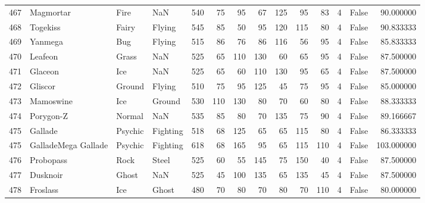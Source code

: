 \begin{tabular}{rlllrrrrrrrrlr}
 467 &                  Magmortar &      Fire &       NaN &    540 &   75 &      95 &       67 &      125 &       95 &     83 &           4 &      False &   90.000000 \\
 468 &                   Togekiss &     Fairy &    Flying &    545 &   85 &      50 &       95 &      120 &      115 &     80 &           4 &      False &   90.833333 \\
 469 &                    Yanmega &       Bug &    Flying &    515 &   86 &      76 &       86 &      116 &       56 &     95 &           4 &      False &   85.833333 \\
 470 &                    Leafeon &     Grass &       NaN &    525 &   65 &     110 &      130 &       60 &       65 &     95 &           4 &      False &   87.500000 \\
 471 &                    Glaceon &       Ice &       NaN &    525 &   65 &      60 &      110 &      130 &       95 &     65 &           4 &      False &   87.500000 \\
 472 &                    Gliscor &    Ground &    Flying &    510 &   75 &      95 &      125 &       45 &       75 &     95 &           4 &      False &   85.000000 \\
 473 &                  Mamoswine &       Ice &    Ground &    530 &  110 &     130 &       80 &       70 &       60 &     80 &           4 &      False &   88.333333 \\
 474 &                  Porygon-Z &    Normal &       NaN &    535 &   85 &      80 &       70 &      135 &       75 &     90 &           4 &      False &   89.166667 \\
 475 &                    Gallade &   Psychic &  Fighting &    518 &   68 &     125 &       65 &       65 &      115 &     80 &           4 &      False &   86.333333 \\
 475 &        GalladeMega Gallade &   Psychic &  Fighting &    618 &   68 &     165 &       95 &       65 &      115 &    110 &           4 &      False &  103.000000 \\
 476 &                  Probopass &      Rock &     Steel &    525 &   60 &      55 &      145 &       75 &      150 &     40 &           4 &      False &   87.500000 \\
 477 &                   Dusknoir &     Ghost &       NaN &    525 &   45 &     100 &      135 &       65 &      135 &     45 &           4 &      False &   87.500000 \\
 478 &                   Froslass &       Ice &     Ghost &    480 &   70 &      80 &       70 &       80 &       70 &    110 &           4 &      False &   80.000000 \\

\end{tabular}
